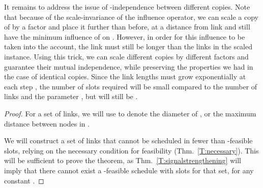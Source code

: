 \documentclass[11pt]{article}
\begin{document}
It remains to address the issue of -independence between different copies. 
Note that because of the scale-invariance of the influence operator, we can scale a copy of  by a factor  and place it further than before, at a distance  from link  and still have the minimum influence of  on . However, in order for this influence to be taken into the account, the link  must still be longer than the links in the scaled instance. Using this trick, we can scale different copies by different factors and guarantee their mutual independence, while preserving the properties we had in the case of identical copies. Since the link lengths must grow exponentially at each step , the number  of slots required will be small compared to the number of links and the parameter , but will still be .

\begin{proof}
For a set  of links, we will use  to denote the diameter of , or the maximum distance between nodes in .

We will construct a set of links that cannot be scheduled in fewer than  -feasible slots, relying on the necessary condition for feasibility (Thm.\ \ref{T:necessary}). This will be sufficient to prove the theorem, as Thm.\ \ref{T:signalstrengthening} will imply that there cannot exist a -feasible schedule with  slots for that set, for any constant .


\end{proof}
\end{document}
